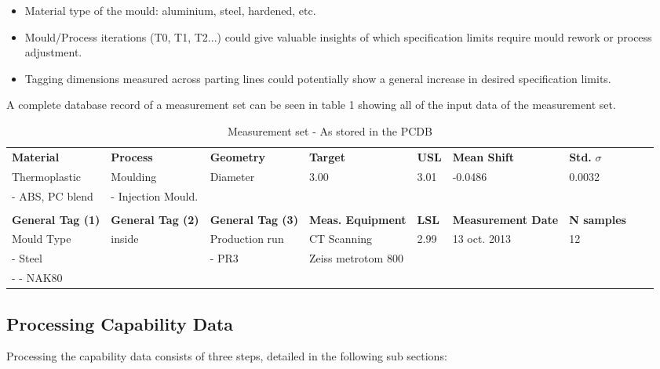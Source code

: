 \documentclass[aip,amsmath, reprint, author-year]{revtex4-1}
\begin{document}
\begin{itemize}
\item Material type of the mould: aluminium, steel, hardened, etc.
\item Mould/Process iterations (T0, T1, T2...) could give valuable insights of which specification limits require mould rework or process adjustment.
\item Tagging dimensions measured across parting lines could potentially show a general increase in desired specification limits. 
\end{itemize}

A complete database record of a measurement set can be seen in table 1 showing all of the input data of the measurement set.

\begingroup
\squeezetable

\begin{table}
\begin{ruledtabular}
\caption{\label{tab:sampleset} Measurement set - As stored in the PCDB}
\begin{tabular}{lllllllll}
\textbf{Material} 		& \textbf{Process} 		& \textbf{Geometry}  		& \textbf{Target}  	& \textbf{USL} 		& \textbf{Mean Shift} & \textbf{Std.}   ${\sigma}$  \\
Thermoplastic 			& Moulding			& Diameter 			& 3.00			& 3.01			& -0.0486			& 0.0032				  \\
 - ABS, PC blend		& - Injection Mould.			\\
\\
\textbf{General Tag (1)} 	& \textbf{General Tag (2)} & \textbf{General Tag (3)}  & \textbf{Meas. Equipment}  	& \textbf{LSL} & \textbf{Measurement Date} 	& \textbf{N samples} \\
Mould Type			& inside				& Production run		 & CT Scanning			& 2.99		& 13 oct. 2013  			& 12\\
- Steel 				& 					& - PR3				 & Zeiss metrotom 800\\
- - NAK80 
\end{tabular}%
\end{ruledtabular}
\end{table}
\endgroup


\subsection{Processing Capability Data}

Processing the capability data consists of three steps, detailed in the following sub sections:
\end{document}
